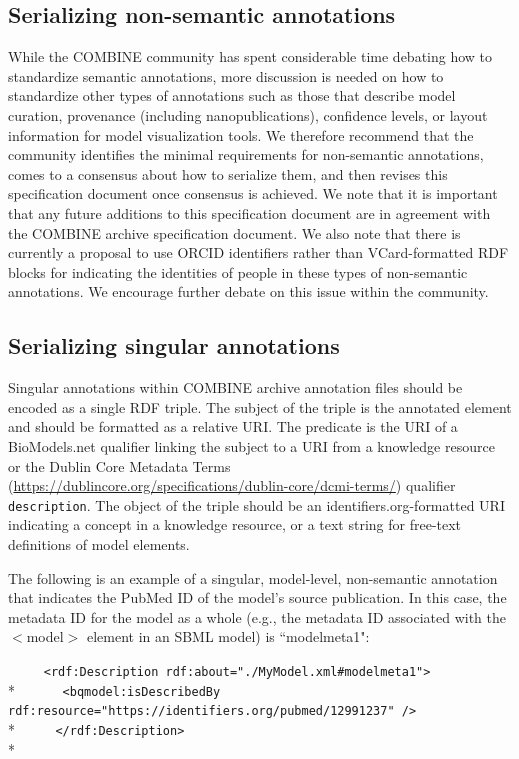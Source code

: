 \documentclass[pdftex,rgb,dvipsnames,svgnames,hyperref,table]{report}
\begin{document}
\subsection{Serializing non-semantic annotations}
While the COMBINE community has spent considerable time debating how to standardize semantic annotations, more discussion is needed on how to standardize other types of annotations such as those that describe model curation, provenance (including nanopublications), confidence levels, or layout information for model visualization tools. We therefore recommend that the community identifies the minimal requirements for non-semantic annotations, comes to a consensus about how to serialize them, and then revises this specification document once consensus is achieved. We note that it is important that any future additions to this specification document are in agreement with the COMBINE archive specification document. We also note that there is currently a proposal to use ORCID identifiers rather than VCard-formatted RDF blocks for indicating the identities of people in these types of non-semantic annotations. We encourage further debate on this issue within the community.  

\subsection{Serializing singular annotations}
\label{singularanns}
Singular annotations within COMBINE archive annotation files should be encoded as a single RDF triple. The subject of the triple is the annotated element and should be formatted as a relative URI. The predicate is the URI of a BioModels.net qualifier linking the subject to a URI from a knowledge resource or the Dublin Core Metadata Terms (\url{https://dublincore.org/specifications/dublin-core/dcmi-terms/}) qualifier \texttt{description}. The object of the triple should be an identifiers.org-formatted URI indicating a concept in a knowledge resource, or a text string for free-text definitions of model elements.

 The following is an example of a singular, model-level, non-semantic annotation that indicates the PubMed ID of the model's source publication. In this case, the metadata ID for the model as a whole (e.g., the metadata ID associated with the $<$model$>$ element in an SBML model) is ``modelmeta1":
 
 \verb|     <rdf:Description rdf:about="./MyModel.xml#modelmeta1">|\\*
 \verb|      <bqmodel:isDescribedBy rdf:resource="https://identifiers.org/pubmed/12991237" />|\\*
 \verb|     </rdf:Description>|\\*
\end{document}
